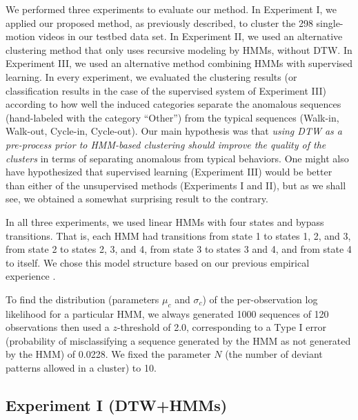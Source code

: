 We performed three experiments to evaluate our method. In Experiment
I, we applied our proposed method, as previously described, to cluster
the 298 single-motion videos in our testbed data set. In Experiment
II, we used an alternative clustering method that only uses recursive
modeling by HMMs, without DTW. In Experiment III, we used an
alternative method combining HMMs with supervised learning. In every
experiment, we evaluated the clustering results (or classification
results in the case of the supervised system of Experiment III)
according to how well the induced categories separate the anomalous
sequences (hand-labeled with the category ``Other'') from the typical
sequences (Walk-in, Walk-out, Cycle-in, Cycle-out). Our main
hypothesis was that \textit{using DTW as a pre-process prior to
HMM-based clustering should improve the quality of the clusters} in
terms of separating anomalous from typical behaviors. One might also
have hypothesized that supervised learning (Experiment III) would be
better than either of the unsupervised methods (Experiments I and II),
but as we shall see, we obtained a somewhat surprising result to the
contrary.

In all three experiments, we used linear HMMs with four states and
bypass transitions. That is, each HMM had transitions from state 1 to
states 1, 2, and 3, from state 2 to states 2, 3, and 4, from state 3
to states 3 and 4, and from state 4 to itself. We chose this model
structure based on our previous empirical
experience .

To find the distribution (parameters $\mu_c$ and $\sigma_c$) of the
per-observation log likelihood for a particular HMM, we always
generated 1000 sequences of 120 observations then used a $z$-threshold
of 2.0, corresponding to a Type I error (probability of misclassifying
a sequence generated by the HMM as not generated by the HMM) of
0.0228.  We fixed the parameter $N$ (the number of deviant patterns
allowed in a cluster) to 10.

\subsection{Experiment I (DTW+HMMs)}

